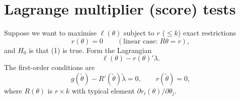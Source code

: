 \documentclass[11pt]{article}
\begin{document}
\section{Lagrange multiplier (score) tests}

Suppose we want to maximise $\ell(\theta)$ subject to $r$ ($\le k$) exact restrictions
\begin{equation}\tag{1}
 r(\theta)=0\qquad(\text{linear case: } R\theta=r),
\end{equation}
and $H_{0}$ is that (1) is true. Form the Lagrangian
\begin{equation}\tag{2}
 \ell(\theta)-r(\theta)'\lambda .
\end{equation}
The first-order conditions are
\begin{equation}\tag{3}
 g(\tilde\theta)-R'(\tilde\theta)\tilde\lambda=0,\qquad r(\tilde\theta)=0,
\end{equation}
where $R(\theta)$ is $r\times k$ with typical element $\partial r_{i}(\theta)/\partial\theta_{j}$.
\end{document}
